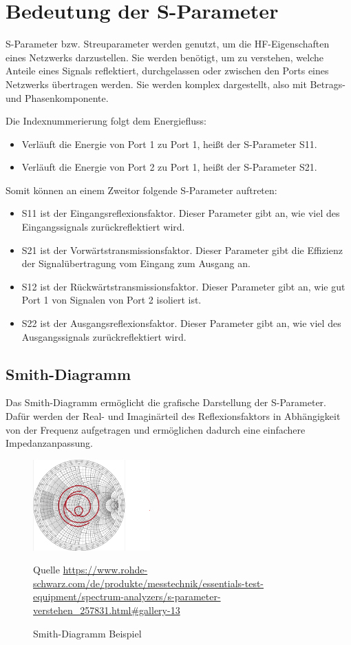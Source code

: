 \section{Bedeutung der S-Parameter}
S-Parameter bzw. Streuparameter werden genutzt, um die HF-Eigenschaften eines
Netzwerks darzustellen. Sie werden benötigt, um zu verstehen, welche Anteile eines Signals
reflektiert, durchgelassen oder zwischen den Ports eines Netzwerks übertragen werden.
Sie werden komplex dargestellt, also mit Betrags- und Phasenkomponente.

Die Indexnummerierung folgt dem Energiefluss:

\begin{itemize}
    \item Verläuft die Energie von Port 1 zu Port 1, heißt der S-Parameter S11.
    \item Verläuft die Energie von Port 2 zu Port 1, heißt der S-Parameter S21.
\end{itemize}
Somit können an einem Zweitor folgende S-Parameter auftreten:
\begin{itemize}
    \item S11 ist der Eingangsreflexionsfaktor. Dieser Parameter gibt an, wie viel des Eingangssignals zurückreflektiert wird.
    \item S21 ist der Vorwärtstransmissionsfaktor. Dieser Parameter gibt die Effizienz der Signalübertragung vom Eingang zum Ausgang an.
    \item S12 ist der Rückwärtstransmissionsfaktor. Dieser Parameter gibt an, wie gut Port 1 von Signalen von Port 2 isoliert ist.
    \item S22 ist der Ausgangsreflexionsfaktor. Dieser Parameter gibt an, wie viel des Ausgangssignals zurückreflektiert wird.
\end{itemize}

\subsection{Smith-Diagramm}
Das Smith-Diagramm ermöglicht die grafische Darstellung der S-Parameter.
Dafür werden der Real- und Imaginärteil des Reflexionsfaktors in Abhängigkeit von der Frequenz
aufgetragen und ermöglichen dadurch eine einfachere Impedanzanpassung.
\begin{figure}[h]
    \centering
    \includegraphics[width=0.4\textwidth]{Pictures/SmithDiagram.png}
    \caption{Smith-Diagramm Beispiel}
    \footnotesize{Quelle \url{https://www.rohde-schwarz.com/de/produkte/messtechnik/essentials-test-equipment/spectrum-analyzers/s-parameter-verstehen_257831.html#gallery-13}}
\end{figure}

